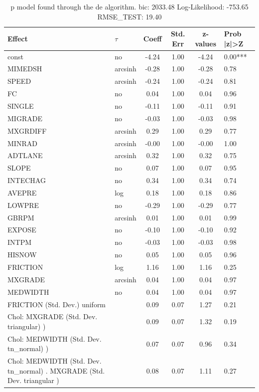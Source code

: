\begin{table}
	\caption{p model found through the de algorithm. bic: 2033.48 Log-Likelihood: -753.65 RMSE_TEST: 19.40}
	\begin{center}
		\begin{tabular}{|l|l|c|c|c|l|}
			\hline
			Effect & $\tau$ & Coeff & Std. Err & z-values & Prob |z|>Z \\
			\hline
			const & no & -4.24 & 1.00 & -4.24 & 0.00*** \\
			\hline
			MIMEDSH & arcsinh & -0.28 & 1.00 & -0.28 & 0.78 \\
			\hline
			SPEED & arcsinh & -0.24 & 1.00 & -0.24 & 0.81 \\
			\hline
			FC & no & 0.04 & 1.00 & 0.04 & 0.96 \\
			\hline
			SINGLE & no & -0.11 & 1.00 & -0.11 & 0.91 \\
			\hline
			MIGRADE & no & -0.03 & 1.00 & -0.03 & 0.98 \\
			\hline
			MXGRDIFF & arcsinh & 0.29 & 1.00 & 0.29 & 0.77 \\
			\hline
			MINRAD & arcsinh & -0.00 & 1.00 & -0.00 & 1.00 \\
			\hline
			ADTLANE & arcsinh & 0.32 & 1.00 & 0.32 & 0.75 \\
			\hline
			SLOPE & no & 0.07 & 1.00 & 0.07 & 0.95 \\
			\hline
			INTECHAG & no & 0.34 & 1.00 & 0.34 & 0.74 \\
			\hline
			AVEPRE & log & 0.18 & 1.00 & 0.18 & 0.86 \\
			\hline
			LOWPRE & no & -0.29 & 1.00 & -0.29 & 0.77 \\
			\hline
			GBRPM & arcsinh & 0.01 & 1.00 & 0.01 & 0.99 \\
			\hline
			EXPOSE & no & -0.10 & 1.00 & -0.10 & 0.92 \\
			\hline
			INTPM & no & -0.03 & 1.00 & -0.03 & 0.98 \\
			\hline
			HISNOW & no & 0.05 & 1.00 & 0.05 & 0.96 \\
			\hline
			FRICTION & log & 1.16 & 1.00 & 1.16 & 0.25 \\
			\hline
			MXGRADE & arcsinh & 0.04 & 1.00 & 0.04 & 0.97 \\
			\hline
			MEDWIDTH & no & 0.04 & 1.00 & 0.04 & 0.97 \\
			\hline
			FRICTION (Std. Dev.) uniform &  & 0.09 & 0.07 & 1.27 & 0.21 \\
			\hline
			 Chol: MXGRADE (Std. Dev. triangular) ) &  & 0.09 & 0.07 & 1.32 & 0.19 \\
			\hline
			 Chol: MEDWIDTH (Std. Dev. tn_normal) ) &  & 0.07 & 0.07 & 0.96 & 0.34 \\
			\hline
			 Chol: MEDWIDTH (Std. Dev. tn_normal) . MXGRADE (Std. Dev.   triangular ) &  & 0.08 & 0.07 & 1.11 & 0.27 \\
			\hline
		\end{tabular}
	\end{center}
\end{table}